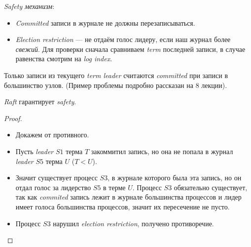 \newpage
\begin{definition} \textit{Safety механизм}:
    \begin{itemize}
        \item \textit{Committed} записи в журнале не должны перезаписываться.
        \item \textit{Election restriction} --- не отдаём голос лидеру,
            если наш журнал более \textit{свежий}. Для проверки сначала сравниваем
            \textit{term} последней записи, в случае равенства смотрим на \textit{log index}.
    \end{itemize}
\end{definition}

\begin{remark}
    Только записи из текущего \textit{term leader} считаются
    \textit{committed} при записи в большинство узлов. (Пример проблемы подробно
    рассказан на 8 лекции).
\end{remark}

\begin{theorem}
    \textit{Raft} гарантирует \textit{safety}.
\end{theorem}
\begin{proof}
    \enewline
    \begin{itemize}
        \item Докажем от противного.
        \item Пусть \textit{leader} $S1$ терма $T$ закоммитил запись, но она не попала
            в журнал \textit{leader} $S5$ терма $U$ ($T < U$).
        \item Значит существует процесс $S3$, в журнале которого была эта запись, но
            он отдал голос за лидерство $S5$ в терме $U$. Процесс $S3$ обязательно существует,
            так как \textit{commited} запись лежит в журнале большинства процессов и лидер
            имеет голоса большинства процессов, значит их пересечение не пусто.
        \item Процесс $S3$ нарушил \textit{election restriction}, получено противоречие.
    \end{itemize}
\end{proof}

